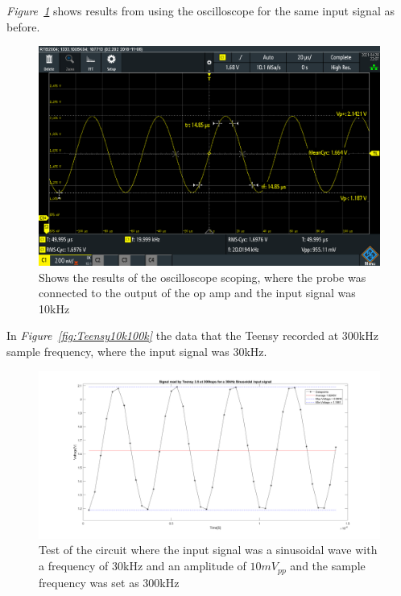  \textit{Figure~\ref{fig:Oscillo20k200k}} shows results from using the oscilloscope for the same input signal as before.

\begin{figure}[h]
    \centering
    \includegraphics[width=1.0\textwidth]{graphics/20k10mvPP200ksamp.PNG}
    \caption{Shows the results of the oscilloscope scoping, where the probe was connected to the output of the op amp and the input signal was 10kHz}
    \label{fig:Oscillo20k200k}
\end{figure}

In \textit{Figure~\ref{fig:Teensy10k100k}} the data that the Teensy recorded at 300kHz sample frequency, where the input signal was 30kHz.

\begin{figure}[h]
    \centering
    \includegraphics[width=1.0\textwidth]{graphics/30kin_300ksampl.png}
    \caption{Test of the circuit where the input signal was a sinusoidal wave with a frequency of 30kHz and an amplitude of $10mV_{pp}$ and the sample frequency was set as 300kHz}
    \label{fig:Teensy30k300k}
\end{figure}


